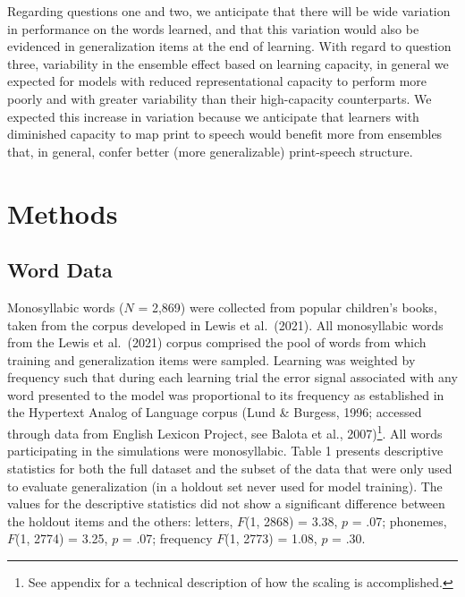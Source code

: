 \documentclass[
  ,man,floatsintext]{apa6}
\begin{document}
Regarding questions one and two, we anticipate that there will be wide variation in performance on the words learned, and that this variation would also be evidenced in generalization items at the end of learning. With regard to question three, variability in the ensemble effect based on learning capacity, in general we expected for models with reduced representational capacity to perform more poorly and with greater variability than their high-capacity counterparts. We expected this increase in variation because we anticipate that learners with diminished capacity to map print to speech would benefit more from ensembles that, in general, confer better (more generalizable) print-speech structure.

\hypertarget{methods}{%
\section{Methods}\label{methods}}

\hypertarget{word-data}{%
\subsection{Word Data}\label{word-data}}

Monosyllabic words (\(N\) = 2,869) were collected from popular children's books, taken from the corpus developed in Lewis et al.~(2021). All monosyllabic words from the Lewis et al.~(2021) corpus comprised the pool of words from which training and generalization items were sampled. Learning was weighted by frequency such that during each learning trial the error signal associated with any word presented to the model was proportional to its frequency as established in the Hypertext Analog of Language corpus (Lund \& Burgess, 1996; accessed through data from English Lexicon Project, see Balota et al., 2007)\footnote{See appendix for a technical description of how the scaling is accomplished.}. All words participating in the simulations were monosyllabic. Table 1 presents descriptive statistics for both the full dataset and the subset of the data that were only used to evaluate generalization (in a holdout set never used for model training). The values for the descriptive statistics did not show a significant difference between the holdout items and the others: letters, \(F\)(1, 2868) = 3.38, \(p\) = .07; phonemes, \(F\)(1, 2774) = 3.25, \(p\) = .07; frequency \(F\)(1, 2773) = 1.08, \(p\) = .30.
\end{document}

